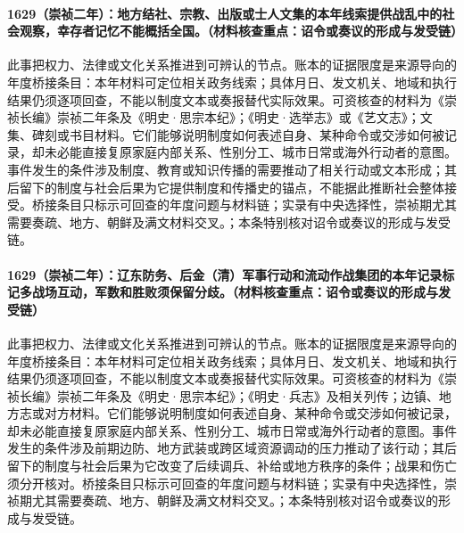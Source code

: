 \paragraph{1629（崇祯二年）：地方结社、宗教、出版或士人文集的本年线索提供战乱中的社会观察，幸存者记忆不能概括全国。（材料核查重点：诏令或奏议的形成与发受链）} 此事把权力、法律或文化关系推进到可辨认的节点。账本的证据限度是来源导向的年度桥接条目：本年材料可定位相关政务线索；具体月日、发文机关、地域和执行结果仍须逐项回查，不能以制度文本或奏报替代实际效果。可资核查的材料为《崇祯长编》崇祯二年条及《明史·思宗本纪》；《明史·选举志》或《艺文志》；文集、碑刻或书目材料。它们能够说明制度如何表述自身、某种命令或交涉如何被记录，却未必能直接复原家庭内部关系、性别分工、城市日常或海外行动者的意图。事件发生的条件涉及制度、教育或知识传播的需要推动了相关行动或文本形成；其后留下的制度与社会后果为它提供制度和传播史的锚点，不能据此推断社会整体接受。桥接条目只标示可回查的年度问题与材料链；实录有中央选择性，崇祯期尤其需要奏疏、地方、朝鲜及满文材料交叉。；本条特别核对诏令或奏议的形成与发受链。

\paragraph{1629（崇祯二年）：辽东防务、后金（清）军事行动和流动作战集团的本年记录标记多战场互动，军数和胜败须保留分歧。（材料核查重点：诏令或奏议的形成与发受链）} 此事把权力、法律或文化关系推进到可辨认的节点。账本的证据限度是来源导向的年度桥接条目：本年材料可定位相关政务线索；具体月日、发文机关、地域和执行结果仍须逐项回查，不能以制度文本或奏报替代实际效果。可资核查的材料为《崇祯长编》崇祯二年条及《明史·思宗本纪》；《明史·兵志》及相关列传；边镇、地方志或对方材料。它们能够说明制度如何表述自身、某种命令或交涉如何被记录，却未必能直接复原家庭内部关系、性别分工、城市日常或海外行动者的意图。事件发生的条件涉及前期边防、地方武装或跨区域资源调动的压力推动了该行动；其后留下的制度与社会后果为它改变了后续调兵、补给或地方秩序的条件；战果和伤亡须分开核对。桥接条目只标示可回查的年度问题与材料链；实录有中央选择性，崇祯期尤其需要奏疏、地方、朝鲜及满文材料交叉。；本条特别核对诏令或奏议的形成与发受链。

